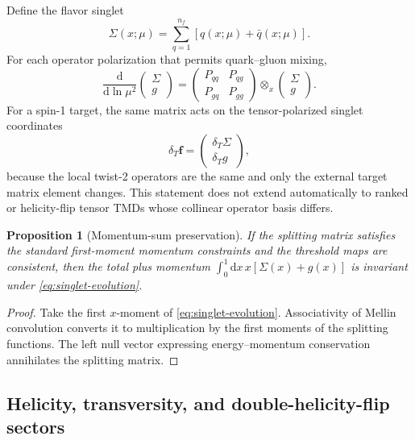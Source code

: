 \documentclass[11pt]{article}
\newtheorem{proposition}[definition]{Proposition}
\newcommand{\dd}{\mathrm{d}}
\newcommand{\otimesx}{\mathop{\otimes}_{x}}
\begin{document}
Define the flavor singlet
\begin{equation}
 \Sigma(x;\mu)=\sum_{q=1}^{n_f}
 \left[q(x;\mu)+\bar q(x;\mu)\right].
 \label{eq:singlet-definition}
\end{equation}
For each operator polarization that permits quark--gluon mixing,
\begin{equation}
 \frac{\dd}{\dd\ln\mu^2}
 \begin{pmatrix}
  \Sigma\\g
 \end{pmatrix}
 =
 \begin{pmatrix}
  P_{qq}&P_{qg}\\
  P_{gq}&P_{gg}
 \end{pmatrix}
 \otimesx
 \begin{pmatrix}
  \Sigma\\g
 \end{pmatrix}.
 \label{eq:singlet-evolution}
\end{equation}
For a spin-1 target, the same matrix acts on the tensor-polarized singlet
coordinates
\begin{equation}
 \delta_T\bm f
 =
 \begin{pmatrix}
  \delta_T\Sigma\\
  \delta_T g
 \end{pmatrix},
 \label{eq:tensor-singlet-vector}
\end{equation}
because the local twist-2 operators are the same and only the external target
matrix element changes.  This statement does not extend automatically to
ranked or helicity-flip tensor TMDs whose collinear operator basis differs.

\begin{proposition}[Momentum-sum preservation]
If the splitting matrix satisfies the standard first-moment momentum
constraints and the threshold maps are consistent, then the total plus
momentum
\(
\int_0^1\dd x\,x[\Sigma(x)+g(x)]
\)
is invariant under \cref{eq:singlet-evolution}.
\end{proposition}

\begin{proof}
Take the first \(x\)-moment of \cref{eq:singlet-evolution}.  Associativity of
Mellin convolution converts it to multiplication by the first moments of the
splitting functions.  The left null vector expressing energy--momentum
conservation annihilates the splitting matrix.
\end{proof}

\subsection{Helicity, transversity, and double-helicity-flip sectors}
\end{document}
